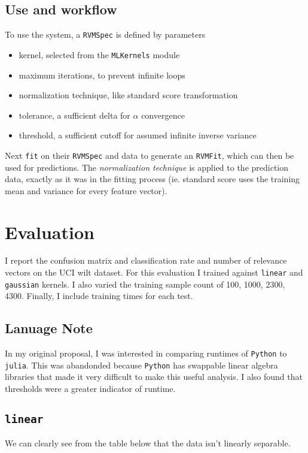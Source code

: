 \documentclass[11pt]{article} %
\def\julia{\texttt{julia}\xspace}
\def\python{\texttt{Python}\xspace}
\def\wilt{UCI wilt dataset\xspace}
\begin{document}
\subsection{Use and workflow}
To use the system, a \texttt{RVMSpec} is defined by parameters
\begin{itemize}
  \setlength\itemsep{0em}
\item kernel, selected from the \texttt{MLKernels} module
\item maximum iterations, to prevent infinite loops
\item normalization technique, like standard score transformation
\item tolerance, a sufficient delta for $\alpha$ convergence
\item threshold, a sufficient cutoff for assumed infinite inverse variance
\end{itemize}

Next \texttt{fit} on their \texttt{RVMSpec} and data to
generate an \texttt{RVMFit}, which can then be used for predictions.
The {\em normalization technique} is applied to the prediction
data, exactly as it was in the fitting process (ie. standard
score uses the training mean and variance for every feature vector).

\newpage
\section{Evaluation}
\def\linear{\texttt{linear}\xspace}
\def\radial{\texttt{radialbasis}\xspace}
\def\gaussian{\texttt{gaussian}\xspace}
I report the confusion matrix and classification rate and number
of relevance vectors on the \wilt. For this evaluation I trained
against \linear and \gaussian kernels. I also varied the
training sample count of 100, 1000, 2300, 4300. Finally, I include
training times for each test.

\subsection{Lanuage Note}
In my original proposal, I was interested in comparing runtimes
of \python to \julia. This was abandonded because \python has
swappable linear algebra libraries that made it very difficult to
make this useful analysis. I also found that thresholds were a
greater indicator of runtime.

\subsection{\linear}
We can clearly see from the table below that the data isn't linearly
separable.
\end{document}
